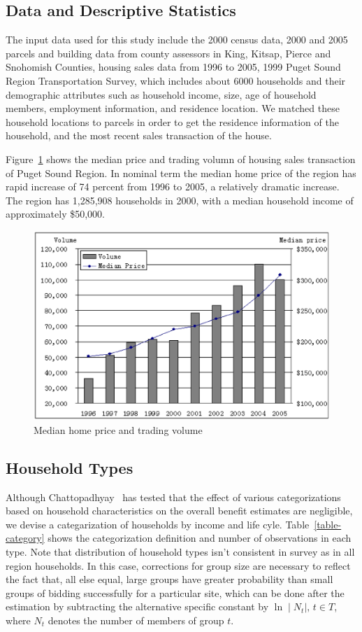 \documentclass{article}
\begin{document}
\subsection{Data and Descriptive Statistics}
\label{data}
The input data used for this study include the 2000 census data, 2000 and 2005
parcels and building data from county assessors in King, Kitsap, Pierce and Snohomish
Counties, housing sales data from 1996 to
2005, 1999 Puget Sound Region Transportation Survey, which
includes about 6000 households and their demographic
attributes such as household income, size, age of household
members, employment information, and residence
location.  We matched these household locations to parcels in order to
get the residence information of the household, and the most recent sales
transaction of the house.

Figure~\ref{fig-price-vol} shows the median price and
trading volumn of housing sales transaction of Puget Sound
Region. In nominal term the median home price of the region
has rapid increase of 74 percent from 1996 to 2005, a relatively dramatic increase.
The region has 1,285,908 households in 2000, with a median household income of
approximately \$50,000.

\begin{figure}[p]
\centering
\includegraphics[scale=.8]{pv.eps}
\caption{Median home price and trading volume}
\label{fig-price-vol}
\end{figure}

\subsection{Household Types}
Although Chattopadhyay~\citeyear{Chattopadhyay1998} has
tested that the effect of various categorizations based on
household characteristics on the overall benefit estimates
are negligible, we devise a categarization of households by
income and life cyle.  Table~\ref{table-category} shows the
categorization definition and number of observations in each
type. Note that distribution of household types isn't
consistent in survey as in all region households.  In this
case, corrections for group size are necessary to reflect
the fact that, all else equal, large groups have greater
probability than small groups of bidding successfully for a
particular site, which can be done after the estimation by
subtracting the alternative specific constant by $\ln \mid
N_t \mid,\, t \in T$, where $N_t$ denotes the number of
members of group $t$.
\end{document}
